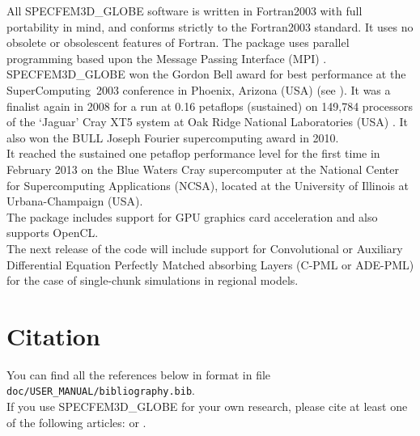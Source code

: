 All SPECFEM3D\_GLOBE software is written in Fortran2003 with full portability
in mind, and conforms strictly to the Fortran2003 standard. It uses
no obsolete or obsolescent features of Fortran. The package uses
parallel programming based upon the Message Passing Interface (MPI)
\citep{GrLuSk94,Pac97}.\\

SPECFEM3D\_GLOBE won the Gordon Bell award for best performance at the SuperComputing~2003
conference in Phoenix, Arizona (USA) (see \cite{KoTsChTr03}).
It was a finalist again in 2008 for a run at 0.16 petaflops (sustained) on 149,784 processors of the `Jaguar' Cray XT5 system at Oak Ridge National Laboratories (USA) \citep{CaKoLaTiMiLeSnTr08}.
It also won the BULL Joseph Fourier supercomputing award in 2010.\\

It reached the sustained one petaflop performance level for the first time in February 2013
on the Blue Waters Cray supercomputer at the National Center for Supercomputing Applications (NCSA), located at the University of Illinois at Urbana-Champaign (USA).\\

The package includes support for GPU graphics card acceleration \citep{Kom11,MiKo10,KoMiEr09,KoErGoMi10} and also supports OpenCL.\\

The next release of the code will include support for
Convolutional or Auxiliary Differential Equation Perfectly Matched absorbing Layers (C-PML or ADE-PML)
\citep{MaKoEz08,MaKoGe08,MaKo09,MaKoGeBr10,KoMa07} for the case of single-chunk simulations in regional models.

\section{Citation}

You can find all the references below in \BibTeX format in file \texttt{doc/USER\_MANUAL/bibliography.bib}.\\

If you use SPECFEM3D\_GLOBE for your own research, please cite at least one
of the following articles: \cite{KoXiBoPeSaLiTr16,TrKoLi08,PeKoLuMaLeCaLeMaLiBlNiBaTr11,VaCaSaKoVi99,LeChLiKoHuTr08,LeChKoHuTr09,LeKoHuTr09,KoMiEr09,KoErGoMi10,WiKoScTr04,KoLiTrSuStSh04,ChKoViCaVaFe07,MaKoDi09,KoViCh10,CaKoLaTiMiLeSnTr08,TrKoHjLiZhPeBoMcFrTrHu10,KoRiTr02,KoTr02a,KoTr02b,KoTr99} or \cite{KoVi98}.\\


